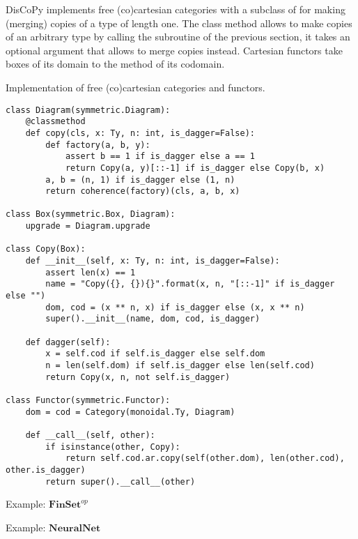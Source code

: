 DisCoPy implements free (co)cartesian categories with a subclass of  for making (merging)  copies of a type  of length one.
The class method  allows to make  copies of an arbitrary type  by calling the  subroutine of the previous section, it takes an optional argument  that allows to merge copies instead.
Cartesian functors take  boxes of its domain to the  method of its codomain.

\begin{python}
{\normalfont Implementation of free (co)cartesian categories and functors.}

\begin{verbatim}
class Diagram(symmetric.Diagram):
    @classmethod
    def copy(cls, x: Ty, n: int, is_dagger=False):
        def factory(a, b, y):
            assert b == 1 if is_dagger else a == 1
            return Copy(a, y)[::-1] if is_dagger else Copy(b, x)
        a, b = (n, 1) if is_dagger else (1, n)
        return coherence(factory)(cls, a, b, x)

class Box(symmetric.Box, Diagram):
    upgrade = Diagram.upgrade

class Copy(Box):
    def __init__(self, x: Ty, n: int, is_dagger=False):
        assert len(x) == 1
        name = "Copy({}, {}){}".format(x, n, "[::-1]" if is_dagger else "")
        dom, cod = (x ** n, x) if is_dagger else (x, x ** n)
        super().__init__(name, dom, cod, is_dagger)

    def dagger(self):
        x = self.cod if self.is_dagger else self.dom
        n = len(self.dom) if self.is_dagger else len(self.cod)
        return Copy(x, n, not self.is_dagger)

class Functor(symmetric.Functor):
    dom = cod = Category(monoidal.Ty, Diagram)

    def __call__(self, other):
        if isinstance(other, Copy):
            return self.cod.ar.copy(self(other.dom), len(other.cod), other.is_dagger)
        return super().__call__(other)
\end{verbatim}
\end{python}

Example: $\mathbf{FinSet}^{op}$

Example: $\mathbf{NeuralNet}$



